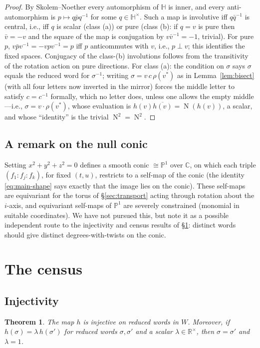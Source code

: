 \documentclass[11pt]{article}
\newtheorem{theorem}{Theorem}[section]
\theoremstyle{definition}
\theoremstyle{remark}
\newcommand{\HH}{\mathbb{H}}
\newcommand{\RR}{\mathbb{R}}
\newcommand{\CC}{\mathbb{C}}
\newcommand{\PP}{\mathbb{P}}
\DeclareMathOperator{\N}{N}
\begin{document}
\begin{proof}
By Skolem--Noether every automorphism of $\HH$ is inner, and every anti-automorphism is $p\mapsto q\bar p q^{-1}$ for some $q\in\HH^\times$. Such a map is involutive iff $q\bar q^{-1}$ is central, i.e., iff $q$ is scalar (class (a)) or pure (class (b): if $q=v$ is pure then $\bar v=-v$ and the square of the map is conjugation by $v\bar v^{-1}=-1$, trivial). For pure $p$, $v\bar pv^{-1}=-vpv^{-1}=p$ iff $p$ anticommutes with $v$, i.e., $p\perp v$; this identifies the fixed spaces. Conjugacy of the class-(b) involutions follows from the transitivity of the rotation action on pure directions. For class (a): the condition on $\sigma$ says $\sigma$ equals the reduced word for $\sigma^{-1}$; writing $\sigma=v\,c\,\rho(v^{*})$ as in Lemma~\ref{lem:bisect} (with all four letters now inverted in the mirror) forces the middle letter to satisfy $c=c^{-1}$ formally, which no letter does, unless one allows the empty middle---i.e., $\sigma=v\cdot\rho(v^*)$, whose evaluation is $h(v)\overline{h(v)}=\N(h(v))$, a scalar, and whose ``identity'' is the trivial $\N^2=\N^2$.
\end{proof}

\subsection{A remark on the null conic}
Setting $x^2+y^2+z^2=0$ defines a smooth conic $\cong\PP^1$ over $\CC$, on which each triple $(f_1:f_j:f_k)$, for fixed $(t,u)$, restricts to a self-map of the conic (the identity \eqref{eq:main-shape} says exactly that the image lies on the conic). These self-maps are equivariant for the torus of \S\ref{sec:transport} acting through rotation about the $i$-axis, and equivariant self-maps of $\PP^1$ are severely constrained (monomial in suitable coordinates). We have not pursued this, but note it as a possible independent route to the injectivity and census results of \S\ref{sec:census}: distinct words should give distinct degrees-with-twists on the conic.

\section{The census}\label{sec:census}

\subsection{Injectivity}

\begin{theorem}\label{thm:inject}
The map $h$ is injective on reduced words in $W$. Moreover, if $h(\sigma)=\lambda\,h(\sigma')$ for reduced words $\sigma,\sigma'$ and a scalar $\lambda\in\RR^\times$, then $\sigma=\sigma'$ and $\lambda=1$.
\end{theorem}
\end{document}
